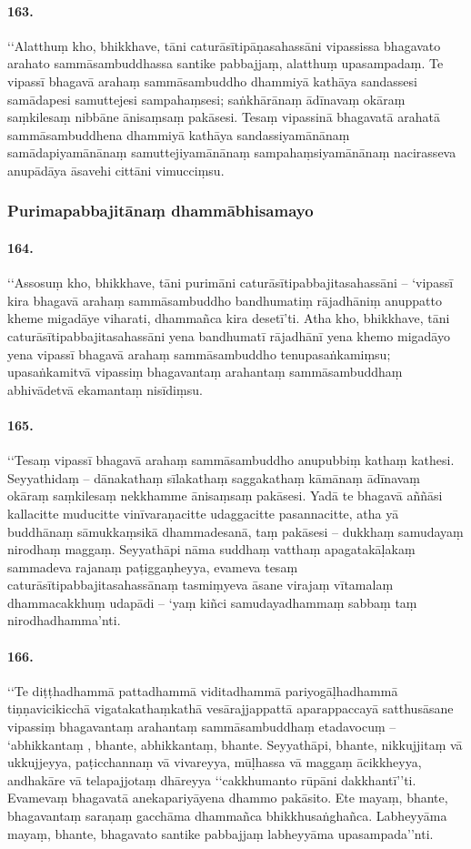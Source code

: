 \paragraph{163.} ‘‘Alatthuṃ kho, bhikkhave, tāni caturāsītipāṇasahassāni vipassissa bhagavato arahato sammāsambuddhassa santike pabbajjaṃ, alatthuṃ upasampadaṃ. Te vipassī bhagavā arahaṃ sammāsambuddho dhammiyā kathāya sandassesi samādapesi samuttejesi sampahaṃsesi; saṅkhārānaṃ ādīnavaṃ okāraṃ saṃkilesaṃ nibbāne ānisaṃsaṃ pakāsesi. Tesaṃ vipassinā bhagavatā arahatā sammāsambuddhena dhammiyā kathāya sandassiyamānānaṃ samādapiyamānānaṃ samuttejiyamānānaṃ sampahaṃsiyamānānaṃ nacirasseva anupādāya āsavehi cittāni vimucciṃsu.

\subsubsection{Purimapabbajitānaṃ dhammābhisamayo}

\paragraph{164.} ‘‘Assosuṃ kho, bhikkhave, tāni purimāni caturāsītipabbajitasahassāni – ‘vipassī kira bhagavā arahaṃ sammāsambuddho bandhumatiṃ rājadhāniṃ anuppatto kheme migadāye viharati, dhammañca kira desetī’ti. Atha kho, bhikkhave, tāni caturāsītipabbajitasahassāni yena bandhumatī rājadhānī yena khemo migadāyo yena vipassī bhagavā arahaṃ sammāsambuddho tenupasaṅkamiṃsu; upasaṅkamitvā vipassiṃ bhagavantaṃ arahantaṃ sammāsambuddhaṃ abhivādetvā ekamantaṃ nisīdiṃsu.

\paragraph{165.} ‘‘Tesaṃ vipassī bhagavā arahaṃ sammāsambuddho anupubbiṃ kathaṃ kathesi. Seyyathidaṃ – dānakathaṃ sīlakathaṃ saggakathaṃ kāmānaṃ ādīnavaṃ okāraṃ saṃkilesaṃ nekkhamme ānisaṃsaṃ pakāsesi. Yadā te bhagavā aññāsi kallacitte muducitte vinīvaraṇacitte udaggacitte pasannacitte, atha yā buddhānaṃ sāmukkaṃsikā dhammadesanā, taṃ pakāsesi – dukkhaṃ samudayaṃ nirodhaṃ maggaṃ. Seyyathāpi nāma suddhaṃ vatthaṃ apagatakāḷakaṃ sammadeva rajanaṃ paṭiggaṇheyya, evameva tesaṃ caturāsītipabbajitasahassānaṃ tasmiṃyeva āsane virajaṃ vītamalaṃ dhammacakkhuṃ udapādi – ‘yaṃ kiñci samudayadhammaṃ sabbaṃ taṃ nirodhadhamma’nti.

\paragraph{166.} ‘‘Te diṭṭhadhammā pattadhammā viditadhammā pariyogāḷhadhammā tiṇṇavicikicchā vigatakathaṃkathā vesārajjappattā aparappaccayā satthusāsane vipassiṃ bhagavantaṃ arahantaṃ sammāsambuddhaṃ etadavocuṃ – ‘abhikkantaṃ , bhante, abhikkantaṃ, bhante. Seyyathāpi, bhante, nikkujjitaṃ vā ukkujjeyya, paṭicchannaṃ vā vivareyya, mūḷhassa vā maggaṃ ācikkheyya, andhakāre vā telapajjotaṃ dhāreyya ‘‘cakkhumanto rūpāni dakkhantī’’ti. Evamevaṃ bhagavatā anekapariyāyena dhammo pakāsito. Ete mayaṃ, bhante, bhagavantaṃ saraṇaṃ gacchāma dhammañca bhikkhusaṅghañca. Labheyyāma mayaṃ, bhante, bhagavato santike pabbajjaṃ labheyyāma upasampada’’nti.

